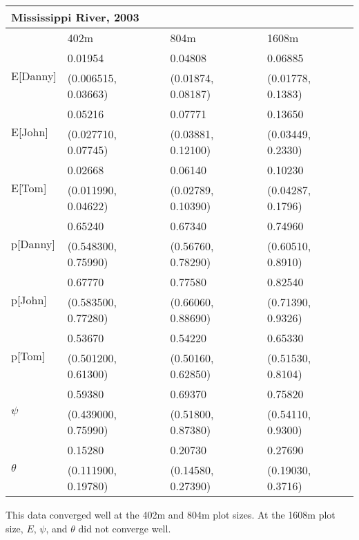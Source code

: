 \documentclass[12pt]{article}
\begin{document}
    \begin{center}
    \begin{tabular}{|l|l|l|l|}
        \hline
        \multicolumn{4}{|l|}{\textbf{Mississippi River, 2003}} \\
        \hline
            & 402m & 804m & 1608m \\
        \hline
        \multirow{2}{*}{E[Danny]}
            & 0.01954 & 0.04808 & 0.06885 \\
            & (0.006515, 0.03663) & (0.01874, 0.08187) & (0.01778, 0.1383) \\
        \hline
        \multirow{2}{*}{E[John]}
            & 0.05216 & 0.07771 & 0.13650 \\
            & (0.027710, 0.07745) & (0.03881, 0.12100) & (0.03449, 0.2330) \\
        \hline
        \multirow{2}{*}{E[Tom]}
            & 0.02668 & 0.06140 & 0.10230 \\
            & (0.011990, 0.04622) & (0.02789, 0.10390) & (0.04287, 0.1796) \\
        \hline
        \multirow{2}{*}{p[Danny]}
            & 0.65240 & 0.67340 & 0.74960 \\
            & (0.548300, 0.75990) & (0.56760, 0.78290) & (0.60510, 0.8910) \\
        \hline
        \multirow{2}{*}{p[John]}
            & 0.67770 & 0.77580 & 0.82540 \\
            & (0.583500, 0.77280) & (0.66060, 0.88690) & (0.71390, 0.9326) \\
        \hline
        \multirow{2}{*}{p[Tom]}
            & 0.53670 & 0.54220 & 0.65330 \\
            & (0.501200, 0.61300) & (0.50160, 0.62850) & (0.51530, 0.8104) \\
        \hline
        \multirow{2}{*}{\(\psi\)}
            & 0.59380 & 0.69370 & 0.75820 \\
            & (0.439000, 0.75990) & (0.51800, 0.87380) & (0.54110, 0.9300) \\
        \hline
        \multirow{2}{*}{\(\theta\)}
            & 0.15280 & 0.20730 & 0.27690 \\
            & (0.111900, 0.19780) & (0.14580, 0.27390) & (0.19030, 0.3716) \\
        \hline
    \end{tabular}
    \end{center}

    This data converged well at the 402m and 804m plot sizes. At the 1608m plot
    size, \(E\), \(\psi\), and \(\theta\) did not converge well.
\end{document}
